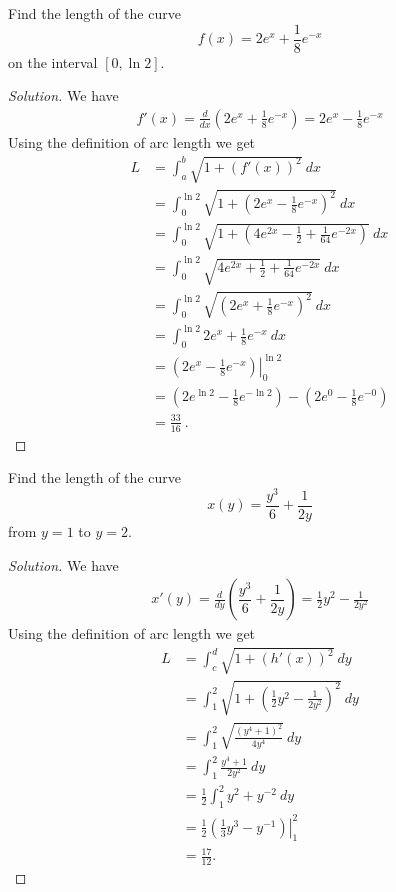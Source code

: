 \documentclass[compacto,10pt,comentarios]{aleph-notas}
\begin{document}
\begin{ejer}
    Find the length of the curve
    $$
        f(x) = 2e^{x} + \frac{1}{8}e^{-x}
    $$
    on the interval $[0, \ln{2}]$.
\end{ejer}
\begin{proof}[Solution]
    We have
    \begin{align*}
        f'(x) = \frac{d}{dx} \left(2e^{x} + \frac{1}{8}e^{-x} \right) = 2e^{x} - \frac{1}{8}e^{-x}
    \end{align*}
    Using the definition of arc length we get 
    \begin{align*}
        L & = \int_{a}^{b} \sqrt{1 + \left( f'(x) \right) ^ {2}} ~ dx \\
        & = \int_{0}^{\ln{2}} \sqrt{1 + \left( 2e^{x} - \frac{1}{8}e^{-x} \right)^{2} } ~ dx \\
        & = \int_{0}^{\ln{2}} \sqrt{1 + \left( 4e^{2x} - \frac{1}{2} + \frac{1}{64}e^{-2x} \right)} ~ dx \\
        & = \int_{0}^{\ln{2}} \sqrt{4e^{2x} + \frac{1}{2} + \frac{1}{64}e^{-2x}} ~ dx \\
        & = \int_{0}^{\ln{2}} \sqrt{\left(2e^{x} + \frac{1}{8} e^{-x}\right)^{2}} ~ dx \\
        & = \int_{0}^{\ln{2}} 2e^{x} + \frac{1}{8} e^{-x} ~ dx \\
        & = \left. \left( 2e^{x} - \frac{1}{8} e^{-x} \right) \right\rvert_{0}^{\ln{2}} \\
        & = \left( 2e^{\ln{2}} - \frac{1}{8} e^{-\ln{2}} \right) - \left( 2e^{0} - \frac{1}{8} e^{-0} \right) \\
        & = \frac{33}{16} ~ .
    \end{align*}
\end{proof}

\begin{ejer}
    Find the length of the curve
    $$
        x(y) = \dfrac{y^3}{6}+\dfrac{1}{2y}
    $$
    from $y = 1$ to $y = 2$. 
\end{ejer}
\begin{proof}[Solution]
    We have
    \begin{align*}
        x'(y) = \frac{d}{dy} \left( \dfrac{y^3}{6}+\dfrac{1}{2y} \right) = \frac{1}{2}y^{2} - \frac{1}{2y^{2}}
    \end{align*}
    Using the definition of arc length we get
    \begin{align*}
        L & = \int_{c}^{d} \sqrt{1 + \left( h'(x) \right) ^ {2}} ~ dy \\
        & = \int_{1}^{2} \sqrt{1 + \left(\frac{1}{2}y^{2} - \frac{1}{2y^{2}} \right)^{2}} ~ dy \\
        & = \int_{1}^{2} \sqrt{\frac{(y^{4} + 1)^{2}}{4y^{4}}} ~ dy \\
        & = \int_{1}^{2} \frac{y^{4} + 1}{2y^{2}} ~ dy \\
        & = \frac{1}{2} \int_{1}^{2} y^{2} + y^{-2} ~ dy \\
        & = \frac{1}{2} \left. \left( \frac{1}{3} y^{3} - y^{-1} \right) \right\rvert_{1}^{2} \\
        & = \frac{17}{12}.
    \end{align*}
\end{proof}
\end{document}
